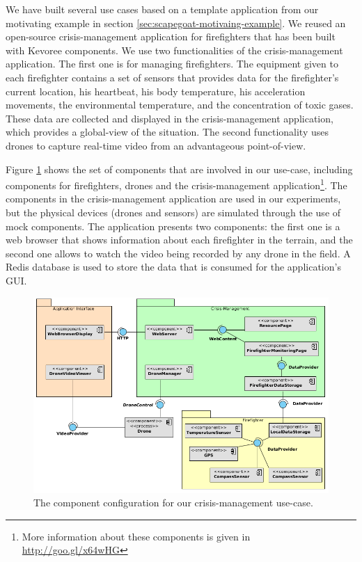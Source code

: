 We have built several use cases based on a template application from our motivating example in section \ref{sec:scapegoat-motivaing-example}.
We reused an open-source crisis-management application for firefighters that has been built with Kevoree components.
We use two functionalities of the crisis-management application.
The first one is for managing firefighters.
The equipment given to each firefighter contains a set of sensors that provides data for the firefighter's current location, his heartbeat, his body temperature, his acceleration movements, the environmental temperature, and the concentration of toxic gases. 
These data are collected and displayed in the crisis-management application, which provides a global-view of the situation. 
The second functionality uses drones to capture real-time video from an advantageous point-of-view.

Figure \ref{fig:complete-usecase} shows the set of components that are involved in our use-case, including components for firefighters, drones and the crisis-management application\footnote{More information about these components is given in \url{http://goo.gl/x64wHG}}. The components in the crisis-management application are used in our experiments, but the physical devices (drones and sensors) are simulated through the use of mock components.
The application presents two components: the first one is a web browser that shows information about each firefighter in the terrain, and the second one allows to watch the video being recorded by any drone in the field.
A Redis database is used to store the data that is consumed for the application's GUI.

\begin{figure}[!bt]
	\centering
	\includegraphics[scale=0.4]{./chapter5/figures/complete-usecase-new2}
	\caption{\label{fig:complete-usecase}The component configuration for our crisis-management use-case.}
\end{figure}

